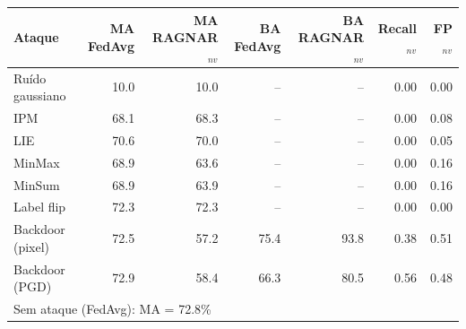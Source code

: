 \begin{tabular}{lrrrrrr}
\toprule
Ataque & MA FedAvg & MA RAGNAR$_{nv}$ & BA FedAvg & BA RAGNAR$_{nv}$ & Recall$_{nv}$ & FP$_{nv}$ \\
\midrule
Ruído gaussiano & 10.0 & 10.0 & -- & -- & 0.00 & 0.00 \\
IPM & 68.1 & 68.3 & -- & -- & 0.00 & 0.08 \\
LIE & 70.6 & 70.0 & -- & -- & 0.00 & 0.05 \\
MinMax & 68.9 & 63.6 & -- & -- & 0.00 & 0.16 \\
MinSum & 68.9 & 63.9 & -- & -- & 0.00 & 0.16 \\
Label flip & 72.3 & 72.3 & -- & -- & 0.00 & 0.00 \\
Backdoor (pixel) & 72.5 & 57.2 & 75.4 & 93.8 & 0.38 & 0.51 \\
Backdoor (PGD) & 72.9 & 58.4 & 66.3 & 80.5 & 0.56 & 0.48 \\
\midrule
\multicolumn{7}{l}{\footnotesize Sem ataque (FedAvg): MA = 72.8\%} \\
\bottomrule
\end{tabular}
